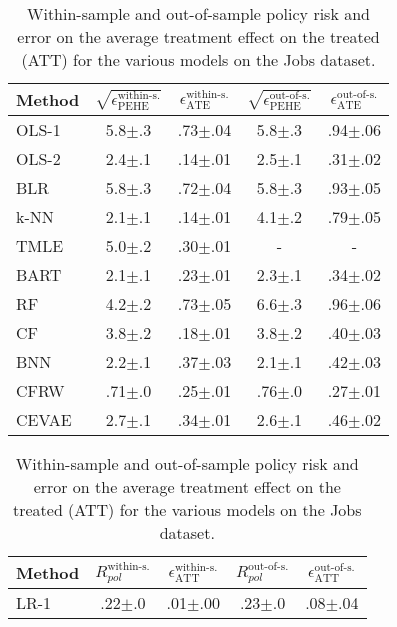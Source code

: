 \documentclass{article}
\begin{document}
\begin{table}[htb!]
\begin{minipage}{.51\linewidth}
\centering
\caption{Within-sample and out-of-sample mean and standard errors for the metrics for the various models at the IHDP dataset.}\label{tab:ihdp}
\begin{adjustbox}{max width=\linewidth}
\begin{tabular}{lcccc}
\toprule
Method & $\sqrt{\epsilon^{\text{within-s.}}_\text{PEHE}}$ & $\epsilon^{\text{within-s.}}_{\text{ATE}}$ & $\sqrt{\epsilon^{\text{out-of-s.}}_\text{PEHE}}$  & $\epsilon^{\text{out-of-s.}}_{\text{ATE}}$ \\\midrule
OLS-1 & 5.8$\pm$.3 & .73$\pm$.04 & 5.8$\pm$.3 & .94$\pm$.06\\
OLS-2 & 2.4$\pm$.1 & .14$\pm$.01 & 2.5$\pm$.1 & .31$\pm$.02\\
BLR & 5.8$\pm$.3 & .72$\pm$.04 & 5.8$\pm$.3 & .93$\pm$.05 \\
k-NN & 2.1$\pm$.1 & .14$\pm$.01 & 4.1$\pm$.2 & .79$\pm$.05\\
TMLE & 5.0$\pm$.2 & .30$\pm$.01 & - & - \\
BART & 2.1$\pm$.1 & .23$\pm$.01 & 2.3$\pm$.1 & .34$\pm$.02 \\
RF & 4.2$\pm$.2 & .73$\pm$.05 & 6.6$\pm$.3 & .96$\pm$.06 \\
CF & 3.8$\pm$.2 & .18$\pm$.01 & 3.8$\pm$.2 & .40$\pm$.03 \\
BNN & 2.2$\pm$.1 & .37$\pm$.03 & 2.1$\pm$.1 & .42$\pm$.03 \\
CFRW & .71$\pm$.0 & .25$\pm$.01 & .76$\pm$.0 & .27$\pm$.01\\\midrule
CEVAE & 2.7$\pm$.1 & .34$\pm$.01& 2.6$\pm$.1 & .46$\pm$.02\\
\bottomrule
\end{tabular}\end{adjustbox}
\end{minipage}\hfill
\begin{minipage}{.45\linewidth}
\centering
\caption{Within-sample and out-of-sample policy risk and error on the average
treatment effect on the treated (ATT) for the various models on the Jobs dataset.}\label{tab:jobs}
\begin{adjustbox}{max width=\linewidth}
\begin{tabular}{lcccc}
\toprule
Method & $R^{\text{within-s.}}_{pol}$ & $\epsilon^{\text{within-s.}}_{\text{ATT}}$ & $R^{\text{out-of-s.}}_{pol}$ & $\epsilon^{\text{out-of-s.}}_{\text{ATT}}$\\\midrule
LR-1 & .22$\pm$.0 & .01$\pm$.00 & .23$\pm$.0 & .08$\pm$.04\\

\end{tabular}
\end{adjustbox}
\end{minipage}
\end{table}
\end{document}
